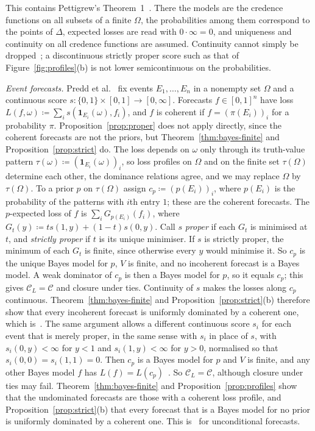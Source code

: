 \documentclass[11pt]{article}
\theoremstyle{definition}
\theoremstyle{remark}
\newcommand{\C}{\mathcal C}
\newcommand{\one}{\mathbf 1}
\begin{document}
This contains Pettigrew's Theorem~1~\cite{Pettigrew}. There the models are the credence functions on all subsets of a finite $\Omega$, the probabilities among them correspond to the points of $\Delta$, expected losses are read with $0\cdot\infty=0$, and uniqueness and continuity on all credence functions are assumed. Continuity cannot simply be dropped~\cite{SSK09}; a discontinuous strictly proper score such as that of Figure~\ref{fig:profiles}(b) is not lower semicontinuous on the probabilities.

\emph{Event forecasts.} Predd et al.~\cite{Predd} fix events $E_1,\dots,E_n$ in a nonempty set $\Omega$ and a continuous score $s:\{0,1\}\times[0,1]\to[0,\infty]$. Forecasts $f\in[0,1]^n$ have loss $L(f,\omega)\coloneqq\sum_is(\one_{E_i}(\omega),f_i)$, and $f$ is coherent if $f=(\pi(E_i))_i$ for a probability $\pi$. Proposition~\ref{prop:proper} does not apply directly, since the coherent forecasts are not the priors, but Theorem~\ref{thm:bayes-finite} and Proposition~\ref{prop:strict} do. The loss depends on $\omega$ only through its truth-value pattern $\tau(\omega)\coloneqq(\one_{E_i}(\omega))_i$, so loss profiles on $\Omega$ and on the finite set $\tau(\Omega)$ determine each other, the dominance relations agree, and we may replace $\Omega$ by $\tau(\Omega)$. To a prior $p$ on $\tau(\Omega)$ assign $c_p\coloneqq(p(E_i))_i$, where $p(E_i)$ is the probability of the patterns with $i$th entry $1$; these are the coherent forecasts. The $p$-expected loss of $f$ is $\sum_iG_{p(E_i)}(f_i)$, where $G_t(y)\coloneqq ts(1,y)+(1-t)s(0,y)$. Call $s$ \emph{proper} if each $G_t$ is minimised at $t$, and \emph{strictly proper} if $t$ is its unique minimiser. If $s$ is strictly proper, the minimum of each $G_t$ is finite, since otherwise every $y$ would minimise it. So $c_p$ is the unique Bayes model for $p$, $V$ is finite, and no incoherent forecast is a Bayes model. A weak dominator of $c_p$ is then a Bayes model for $p$, so it equals $c_p$; this gives $\C_L=\C$ and closure under ties. Continuity of $s$ makes the losses along $c_p$ continuous. Theorem~\ref{thm:bayes-finite} and Proposition~\ref{prop:strict}(b) therefore show that every incoherent forecast is uniformly dominated by a coherent one, which is~\cite[Theorem~1]{Predd}. The same argument allows a different continuous score $s_i$ for each event that is merely proper, in the same sense with $s_i$ in place of $s$, with $s_i(0,y)<\infty$ for $y<1$ and $s_i(1,y)<\infty$ for $y>0$, normalised so that $s_i(0,0)=s_i(1,1)=0$. Then $c_p$ is a Bayes model for $p$ and $V$ is finite, and any other Bayes model $f$ has $L(f)=L(c_p)$~\cite[Lemma~5]{SSK09}. So $\C_L=\C$, although closure under ties may fail. Theorem~\ref{thm:bayes-finite} and Proposition~\ref{prop:profiles} show that the undominated forecasts are those with a coherent loss profile, and Proposition~\ref{prop:strict}(b) that every forecast that is a Bayes model for no prior is uniformly dominated by a coherent one. This is~\cite[Theorem~2, Conclusion~3]{SSK09} for unconditional forecasts.
\end{document}
